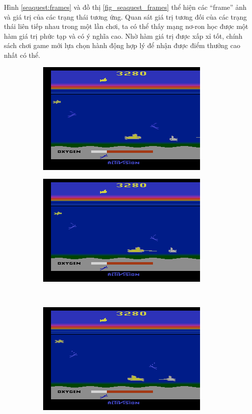 	Hình \ref{seaquest:frames} và đồ thị \ref{fig_seaquest_frames} thể hiện các ``frame'' ảnh và giá trị của các trạng thái tương ứng.
	Quan sát giá trị tương đối của các trạng thái liên tiếp nhau trong một lần chơi, ta có thể thấy mạng nơ-ron học được một hàm giá trị phức tạp và có ý nghĩa cao.
	Nhờ hàm giá trị được xấp xỉ tốt, chính sách chơi game mới lựa chọn hành động hợp lý để nhận được điểm thưởng cao nhất có thể.
	
	\begin{figure}
		\begin{subfigure}{.5\textwidth}
			\centering
			\includegraphics[width=.8\linewidth]{008182}
			\caption{}
			\label{seaquest:frame_1}
		\end{subfigure}%
		\begin{subfigure}{.5\textwidth}
			\centering
			\includegraphics[width=.8\linewidth]{008185}
			\caption{}
			\label{seaquest:frame_2}
		\end{subfigure}\\[2ex]
		\begin{subfigure}{.5\textwidth}
			\centering
			\includegraphics[width=.8\linewidth]{008188}

\end{subfigure}
\end{figure}
